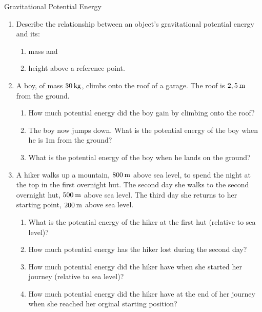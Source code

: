 \begin{exercises}{Gravitational Potential Energy }
            \nopagebreak
\noindent \begin{enumerate}[noitemsep, label=\textbf{\arabic*}. ] 

\item Describe the relationship between an object's gravitational potential energy and its:
\begin{enumerate}[noitemsep, label=\textbf{\alph*}. ] 
\item mass and
\item height above a reference point.
\end{enumerate}

\item A boy, of mass $30\phantom{\rule{2pt}{0ex}}\text{kg}$, climbs onto the roof of a garage. The roof is $2,5\phantom{\rule{2pt}{0ex}}\text{m}$ from the ground. 
\begin{enumerate}[noitemsep, label=\textbf{\alph*}. ] 
\label{m38784*uid54}\item How much potential energy did the boy gain by climbing onto the roof?
\label{m38784*uid55}\item The boy now jumps down. What is the potential energy of the boy when he is $1 \text{m}$ from the ground?
\label{m38784*uid56}\item What is the potential energy of the boy when he lands on the ground?
\end{enumerate}
                \label{m38784*uid57}\item A hiker walks up a mountain, $800\phantom{\rule{2pt}{0ex}}\text{m}$ above sea level, to spend the night at the top in the first overnight hut. The second day she walks to the second overnight hut, $500\phantom{\rule{2pt}{0ex}}\text{m}$ above sea level. The third day she returns to her starting point, $200\phantom{\rule{2pt}{0ex}}\text{m}$ above sea level.
\label{m38784*id66702}\begin{enumerate}[noitemsep, label=\textbf{\alph*}. ] 
            \label{m38784*uid58}\item What is the potential energy of the hiker at the first hut (relative to sea level)?
\label{m38784*uid59}\item How much potential energy has the hiker lost during the second day?
\label{m38784*uid60}\item How much potential energy did the hiker have when she started her journey (relative to sea level)?
\label{m38784*uid61}\item How much potential energy did the hiker have at the end of her journey when she reached her orginal starting position?

\end{enumerate}
\end{enumerate}
\end{exercises}
